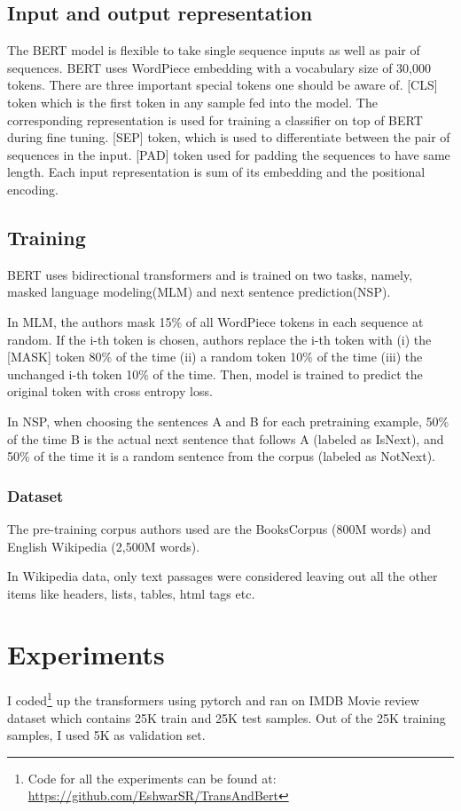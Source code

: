 \documentclass{article}
\begin{document}
\subsection{Input and output representation}
The BERT model is flexible to take single sequence inputs as well as pair of sequences. BERT uses WordPiece \cite{DBLP:journals/corr/WuSCLNMKCGMKSJL16} embedding with a vocabulary size of 30,000 tokens.
There are three important special tokens one should be aware of. [CLS] token which is the first token in any sample fed into the model. The corresponding representation is used for training a classifier on top of BERT during fine tuning. [SEP] token, which is used to differentiate between the pair of sequences in the input. [PAD] token used for padding the sequences to have same length.
Each input representation is sum of its embedding and the positional encoding.

\subsection{Training}
BERT uses bidirectional transformers and is trained on two tasks, namely, masked language modeling(MLM) and next sentence prediction(NSP).

In MLM, the authors mask 15\% of all WordPiece tokens in each sequence at random. If the i-th token is chosen, authors replace the i-th token with (i) the [MASK] token 80\% of the time (ii) a random token 10\% of the time (iii) the unchanged i-th token 10\% of the time. Then, model is trained to predict the original token with cross entropy loss.

In NSP, when choosing the sentences A and B for each pretraining example, 50\% of the time B is the actual next sentence that follows A (labeled as IsNext), and 50\% of the time it is a random sentence from the corpus (labeled as NotNext).

\subsubsection{Dataset}
The pre-training corpus authors used are the BooksCorpus (800M words) \cite{zhu2015aligning} and English Wikipedia (2,500M words).

In Wikipedia data, only text passages were considered leaving out all the other items like headers, lists, tables, html tags etc.

\section{Experiments}
I coded\footnote{Code for all the experiments can be found at: \url{https://github.com/EshwarSR/TransAndBert}} up the transformers using pytorch and ran on IMDB Movie review dataset \cite{maas-EtAl:2011:ACL-HLT2011} which contains 25K train and 25K test samples. Out of the 25K training samples, I used 5K as validation set. 
\end{document}

